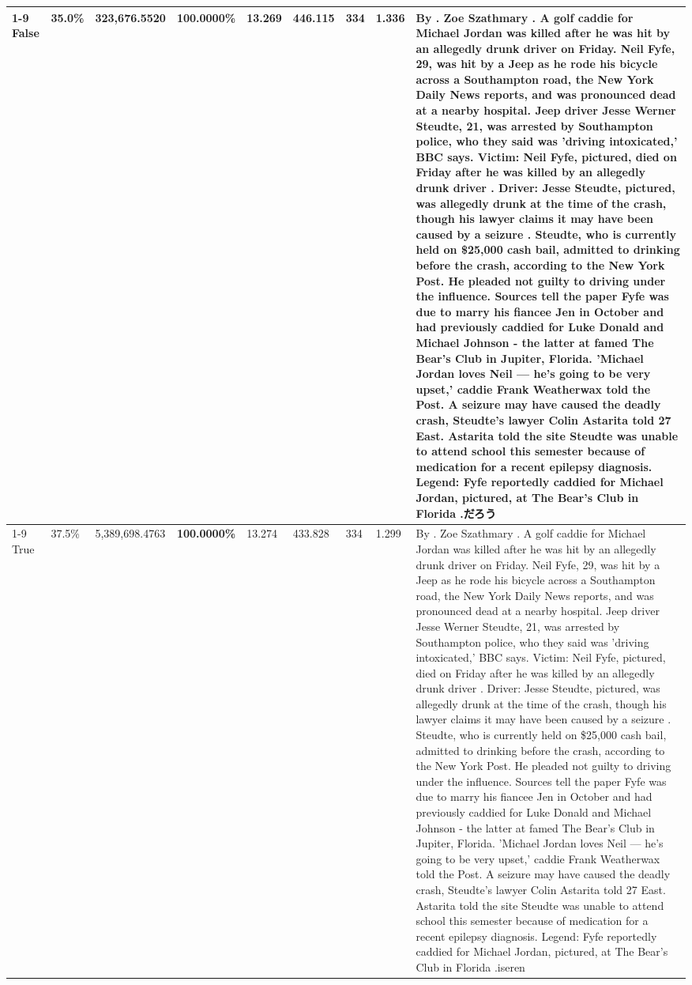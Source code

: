 \begin{table}[H]
\begin{tabular}{lllrlllll}
\cline{1-9}
False & 35.0\% & 323,676.5520 & \bfseries \color{red} 100.0000\% & 13.269 & 446.115 & 334 & 1.336 & By . Zoe Szathmary . A golf caddie for Michael Jordan was killed after he was hit by an allegedly drunk driver on Friday. Neil Fyfe, 29, was hit by a Jeep as he rode his bicycle across a Southampton road, the New York Daily News reports, and was pronounced dead at a nearby hospital. Jeep driver Jesse Werner Steudte, 21, was arrested by Southampton police, who they said was 'driving intoxicated,' BBC says. Victim: Neil Fyfe, pictured, died on Friday after he was killed by an allegedly drunk driver . Driver: Jesse Steudte, pictured, was allegedly drunk at the time of the crash, though his lawyer claims it may have been caused by a seizure . Steudte, who is currently held on \$25,000 cash bail, admitted to drinking before the crash, according to the New York Post. He pleaded not guilty to driving under the influence. Sources tell the paper Fyfe was due to marry his fiancee Jen in October and had previously caddied for Luke Donald and Michael Johnson - the latter at famed The Bear's Club in Jupiter, Florida. 'Michael Jordan loves Neil — he’s going to be very upset,' caddie Frank Weatherwax told the Post. A seizure may have caused the deadly crash, Steudte's lawyer Colin Astarita told 27 East. Astarita told the site Steudte was unable to attend school this semester because of medication for a recent epilepsy diagnosis. Legend: Fyfe reportedly caddied for Michael Jordan, pictured, at The Bear's Club in Florida .だろう \\
\cline{1-9}
True & 37.5\% & 5,389,698.4763 & \bfseries \color{red} 100.0000\% & 13.274 & 433.828 & 334 & 1.299 & By . Zoe Szathmary . A golf caddie for Michael Jordan was killed after he was hit by an allegedly drunk driver on Friday. Neil Fyfe, 29, was hit by a Jeep as he rode his bicycle across a Southampton road, the New York Daily News reports, and was pronounced dead at a nearby hospital. Jeep driver Jesse Werner Steudte, 21, was arrested by Southampton police, who they said was 'driving intoxicated,' BBC says. Victim: Neil Fyfe, pictured, died on Friday after he was killed by an allegedly drunk driver . Driver: Jesse Steudte, pictured, was allegedly drunk at the time of the crash, though his lawyer claims it may have been caused by a seizure . Steudte, who is currently held on \$25,000 cash bail, admitted to drinking before the crash, according to the New York Post. He pleaded not guilty to driving under the influence. Sources tell the paper Fyfe was due to marry his fiancee Jen in October and had previously caddied for Luke Donald and Michael Johnson - the latter at famed The Bear's Club in Jupiter, Florida. 'Michael Jordan loves Neil — he’s going to be very upset,' caddie Frank Weatherwax told the Post. A seizure may have caused the deadly crash, Steudte's lawyer Colin Astarita told 27 East. Astarita told the site Steudte was unable to attend school this semester because of medication for a recent epilepsy diagnosis. Legend: Fyfe reportedly caddied for Michael Jordan, pictured, at The Bear's Club in Florida .iseren \\

\end{tabular}
\end{table}
